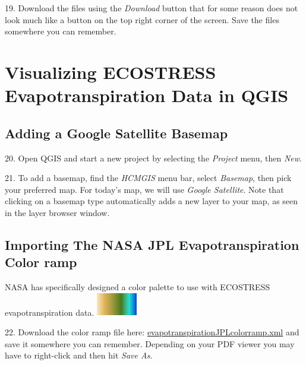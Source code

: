 \documentclass[oneside,a4paper,11pt,explicit]{book}
\begin{document}
\vspace{.5em}


19. Download the files using the \textit{Download} button that for some reason does not look much like a button on the top right corner of the screen. Save the files somewhere you can remember. 

\section{Visualizing ECOSTRESS Evapotranspiration Data in QGIS}

\subsection{Adding a Google Satellite Basemap}

20. Open QGIS and start a new project by selecting the \textit{Project} menu, then \textit{New}.

21. To add a basemap, find the \textit{HCMGIS} menu bar, select \textit{Basemap}, then pick your preferred map. For today's map, we will use \textit{Google Satellite}. Note that clicking on a basemap type automatically adds a new layer to your map, as seen in the layer browser window.

\subsection{Importing The NASA JPL Evapotranspiration Color ramp}

NASA has specifically designed a color palette to use with ECOSTRESS evapotranspiration data. \includegraphics[height= 1cm]{ETcolors.png} 

\vspace{.5em}

22. Download the color ramp file here: \href{https://jeremydforsythe.github.io/icecream-tutorials/Tutorial6_Evaportranspiration1/evapotranspirationJPLcolorramp.xml}{evapotranspirationJPLcolorramp.xml} and save it somewhere you can remember. Depending on your PDF viewer you may have to right-click and then hit \textit{Save As}.
\end{document}
